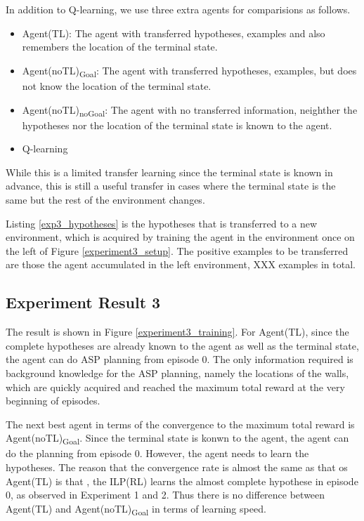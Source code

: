 In addition to Q-learning, we use three extra agents for comparisions as follows. 

\begin{itemize}
    \item Agent(TL): The agent with transferred hypotheses, examples and also remembers the location of the terminal state.
    \item Agent(noTL)\textsubscript{Goal}: The agent with transferred hypotheses, examples, but does not know the location of the terminal state.
    \item Agent(noTL)\textsubscript{noGoal}: The agent with no transferred information, neighther the hypotheses nor the location of the terminal state is known to the agent.
    \item Q-learning
\end{itemize}

While this is a limited transfer learning since the terminal state is known in advance, this is still a useful transfer in cases where the terminal state is the same but the rest of the environment changes.

Listing \ref{exp3_hypotheses} is the hypotheses that is transferred to a new environment, which is acquired by training the agent in the environment once on the left of Figure \ref{experiment3_setup}.
The positive examples to be transferred are those the agent accumulated in the left environment, XXX examples in total.



\subsection{Experiment Result 3}
The result is shown in Figure \ref{experiment3_training}.
For Agent(TL), since the complete hypotheses are already known to the agent as well as the terminal state, the agent can do ASP planning from episode 0.
The only information required is background knowledge for the ASP planning, namely the locations of the walls, which are quickly acquired and reached the maximum total reward at the very beginning of episodes.

The next best agent in terms of the convergence to the maximum total reward is Agent(noTL)\textsubscript{Goal}. Since the terminal state is konwn to the agent, 
the agent can do the planning from episode 0. However, the agent needs to learn the hypotheses. The reason that the convergence rate is almost the same as that os Agent(TL) is that
, the ILP(RL) learns the almost complete hypothese in episode 0, as observed in Experiment 1 and 2. 
Thus there is no difference between Agent(TL) and Agent(noTL)\textsubscript{Goal} in terms of learning speed. 

